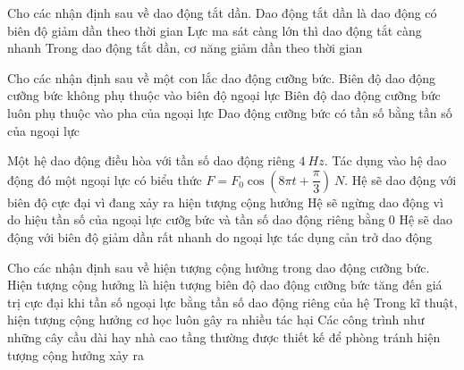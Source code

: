\PhanII
\setcounter{ex}{0}
\begin{ex}
Cho các nhận định sau về dao động tắt dần.
{\True Dao động tắt dần là dao động có biên độ giảm dần theo thời gian}
{\True Lực ma sát càng lớn thì dao động tắt càng nhanh}
{\True Trong dao động tắt dần, cơ năng giảm dần theo thời gian}
\end{ex} 


\begin{ex}
Cho các nhận định sau về một con lắc dao động cưỡng bức.
{Biên độ dao động cưỡng bức không phụ thuộc vào biên độ ngoại lực}
{Biên độ dao động cưỡng bức luôn phụ thuộc vào pha của ngoại lực}
{\True Dao động cưỡng bức có tần số bằng tần số của ngoại lực}
\loigiai{
\begin{itemchoice}
\itemch
\itemch
\itemch
\itemch
\end{itemchoice}
}
\end{ex} 

\begin{ex}
Một hệ dao động điều hòa với tần số dao động riêng $4 \ Hz$. Tác dụng vào hệ dao động đó một ngoại lực có biểu thức $F=F_0 \cos (8 \pi t+\dfrac{\pi}{3})\ N$.
{\True Hệ sẽ dao động với biên độ cực đại vì đang xảy ra hiện tượng cộng hưởng}
{Hệ sẽ ngừng dao động vì do hiệu tần số của ngoại lực cưỡg bức và tần số dao động riêng bằng 0}
{Hệ sẽ dao động với biên độ giảm dần rất nhanh do ngoại lực tác dụng cản trở dao động}
\loigiai{
\begin{itemchoice}
\itemch
\itemch
\itemch
\itemch
\end{itemchoice}
}
\end{ex} 
\begin{ex}
Cho các nhận định sau về hiện tượng cộng hưởng trong dao động cưỡng bức.
{\True Hiện tượng cộng hưởng là hiện tượng biên độ dao động cưỡng bức tăng đến giá trị cực đại khi tần số ngoại lực bằng tần số dao động riêng của hệ}
{Trong kĩ thuật, hiện tượng cộng hưởng cơ học luôn gây ra nhiều tác hại}
{\True Các công trình như những cây cầu dài hay nhà cao tầng thường được thiết kế để phòng tránh hiện tượng cộng hưởng xảy ra}
\loigiai{
\begin{itemchoice}
\itemch
\itemch
\itemch
\itemch
\end{itemchoice}
}
\end{ex} 
